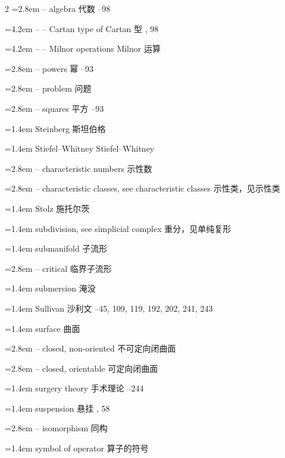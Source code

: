 \begin{multicols}{2}
\noindent\hangindent=2.8em -- algebra \quad 代数 --98\par
\noindent\hangindent=4.2em -- -- Cartan type of \quad Cartan 型 , 98\par
\noindent\hangindent=4.2em -- -- Milnor operations \quad Milnor 运算 \par
\noindent\hangindent=2.8em -- powers \quad 幂 --93\par
\noindent\hangindent=2.8em -- problem \quad 问题 \par
\noindent\hangindent=2.8em -- squares \quad 平方 --93\par
\noindent\hangindent=1.4em Steinberg \quad 斯坦伯格 \par
\noindent\hangindent=1.4em Stiefel--Whitney \quad Stiefel--Whitney \quad\par
\noindent\hangindent=2.8em -- characteristic numbers \quad 示性数 \par
\noindent\hangindent=2.8em -- characteristic classes, see characteristic classes \quad 示性类，见示性类 \quad\par
\noindent\hangindent=1.4em Stolz \quad 施托尔茨 \par
\noindent\hangindent=1.4em subdivision, see simplicial complex \quad 重分，见单纯复形 \quad\par
\noindent\hangindent=1.4em submanifold \quad 子流形 \quad\par
\noindent\hangindent=2.8em -- critical \quad 临界子流形 \par
\noindent\hangindent=1.4em submersion \quad 淹没 \par
\noindent\hangindent=1.4em Sullivan \quad 沙利文 --45, 109, 119, 192, 202, 241, 243\par
\noindent\hangindent=1.4em surface \quad 曲面 \quad\par
\noindent\hangindent=2.8em -- closed, non-oriented \quad 不可定向闭曲面 \par
\noindent\hangindent=2.8em -- closed, orientable \quad 可定向闭曲面 \par
\noindent\hangindent=1.4em surgery theory \quad 手术理论 --244\par
\noindent\hangindent=1.4em suspension \quad 悬挂 , 58\par
\noindent\hangindent=2.8em -- isomorphism \quad 同构 \par
\noindent\hangindent=1.4em symbol of operator \quad 算子的符号 \par
\end{multicols}


